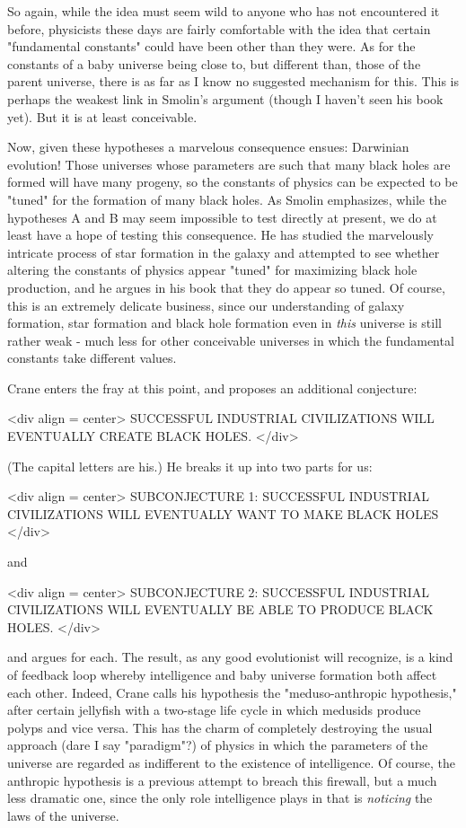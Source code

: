 So again, while the idea must seem wild to anyone who has not
encountered it before, physicists these days are fairly comfortable with
the idea that certain "fundamental constants" could have been other than
they were.  As for the constants of a baby universe being close to, but
different than, those of the parent universe, there is as far as I know
no suggested mechanism for this.  This is perhaps the weakest link in
Smolin's argument (though I haven't seen his book yet).  But it is at
least conceivable.

Now, given these hypotheses a marvelous consequence ensues: Darwinian
evolution!  Those universes whose parameters are such that many black
holes are formed will have many progeny, so the constants of physics can
be expected to be "tuned" for the formation of many black holes.  As
Smolin emphasizes, while the hypotheses A and B may seem impossible to
test directly at present, we do at least have a hope of testing this
consequence.  He has studied the marvelously intricate process of star
formation in the galaxy and attempted to see whether altering the
constants of physics appear "tuned" for maximizing black hole
production, and he argues in his book that they do appear so tuned.  
Of course, this is an extremely delicate business, since our
understanding of galaxy formation, star formation and black hole
formation even in \emph{this} universe is still rather weak - much less for
other conceivable universes in which the fundamental constants take
different values.  

Crane enters the fray at this point, and proposes an additional
conjecture:

<div align = center>
SUCCESSFUL INDUSTRIAL CIVILIZATIONS WILL EVENTUALLY CREATE BLACK
HOLES.
</div>

(The capital letters are his.)  He breaks it up into two parts for us:

<div align = center>
SUBCONJECTURE 1: SUCCESSFUL INDUSTRIAL CIVILIZATIONS WILL EVENTUALLY
WANT TO MAKE BLACK HOLES
</div>

and

<div align = center>
SUBCONJECTURE 2: SUCCESSFUL INDUSTRIAL CIVILIZATIONS WILL EVENTUALLY
BE ABLE TO PRODUCE BLACK HOLES.
</div>

and argues for each.  The result, as any good evolutionist will
recognize, is a kind of feedback loop whereby intelligence and baby
universe formation both affect each other.  Indeed, Crane calls his
hypothesis the "meduso-anthropic hypothesis," after certain jellyfish
with a two-stage life cycle in which medusids produce polyps and vice
versa.  This has the charm of completely destroying the usual approach
(dare I say "paradigm"?) of physics in which the parameters of the
universe are regarded as indifferent to the existence of intelligence.
Of course, the anthropic hypothesis is a previous attempt to breach this
firewall, but a much less dramatic one, since the only role intelligence
plays in that is \emph{noticing} the laws of the universe.

